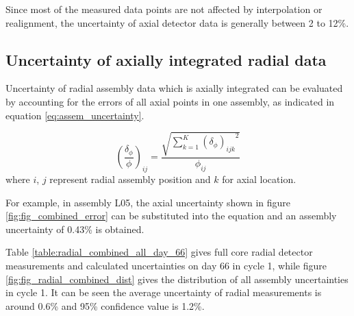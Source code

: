 \documentclass{article}
\begin{document}
Since most of the measured data points are not affected by interpolation or realignment, the uncertainty of axial detector data is generally between 2 to 12\%.

\subsection{Uncertainty of axially integrated radial data}

Uncertainty of radial assembly data which is axially integrated can be evaluated by accounting for the errors of all axial points in one assembly, as indicated in equation \ref{eq:assem_uncertainty}.

\begin{equation}
\label{eq:assem_uncertainty}
  \left(\frac{\delta_\phi}{\phi} \right)_{ij} = \frac{\sqrt{\sum_{k=1}^K {\left(\delta_\phi\right)_{ijk}}^{2}}}{\phi_{ij}}
\end{equation}
where $i$, $j$ represent radial assembly position and $k$ for axial location.

For example, in assembly L05, the axial uncertainty shown in figure \ref{fig:fig_combined_error} can be substituted into the equation and an assembly uncertainty of 0.43\% is obtained.

Table \ref{table:radial_combined_all_day_66} gives full core radial detector measurements and calculated uncertainties on day 66 in cycle 1, while figure \ref{fig:fig_radial_combined_dist} gives the distribution of all assembly uncertainties in cycle 1. It can be seen the average uncertainty of radial measurements is around 0.6\% and 95\% confidence value is 1.2\%.
\end{document}
